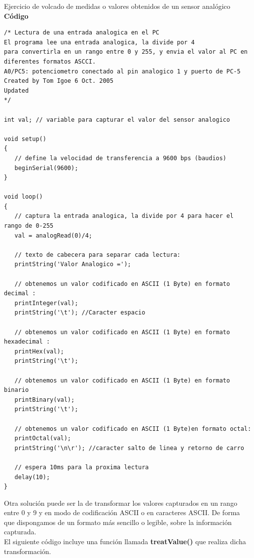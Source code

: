 Ejercicio de volcado de medidas o valores obtenidos de un sensor analógico\\
\textbf{Código}
\begin{lstlisting}
/* Lectura de una entrada analogica en el PC
El programa lee una entrada analogica, la divide por 4
para convertirla en un rango entre 0 y 255, y envia el valor al PC en diferentes formatos ASCCI.
A0/PC5: potenciometro conectado al pin analogico 1 y puerto de PC-5
Created by Tom Igoe 6 Oct. 2005
Updated
*/

int val; // variable para capturar el valor del sensor analogico

void setup()
{
   // define la velocidad de transferencia a 9600 bps (baudios)
   beginSerial(9600);
}

void loop()
{
   // captura la entrada analogica, la divide por 4 para hacer el rango de 0-255
   val = analogRead(0)/4;

   // texto de cabecera para separar cada lectura:
   printString('Valor Analogico =');

   // obtenemos un valor codificado en ASCII (1 Byte) en formato decimal :
   printInteger(val);
   printString('\t'); //Caracter espacio

   // obtenemos un valor codificado en ASCII (1 Byte) en formato hexadecimal :
   printHex(val);
   printString('\t');

   // obtenemos un valor codificado en ASCII (1 Byte) en formato binario
   printBinary(val);
   printString('\t');

   // obtenemos un valor codificado en ASCII (1 Byte)en formato octal:
   printOctal(val);
   printString('\n\r'); //caracter salto de linea y retorno de carro

   // espera 10ms para la proxima lectura
   delay(10);
}
\end{lstlisting}
Otra solución puede ser la de transformar los valores capturados en un rango entre 0 y 9 y en modo de codificación ASCII o en caracteres ASCII. De forma que dispongamos de un formato más sencillo o legible, sobre la información capturada.\\
El siguiente código incluye una función llamada \textbf{treatValue()} que realiza dicha transformación.
